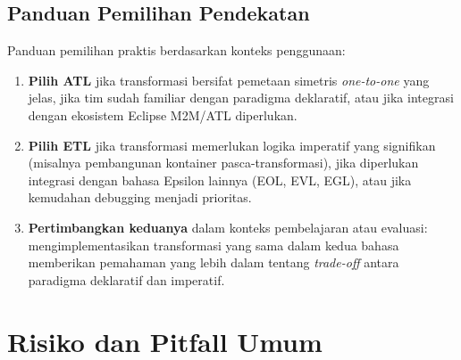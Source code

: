 \subsection{Panduan Pemilihan Pendekatan}

Panduan pemilihan praktis berdasarkan konteks penggunaan:
\begin{enumerate}
  \item \textbf{Pilih ATL} jika transformasi bersifat pemetaan simetris \textit{one-to-one} yang jelas, jika tim sudah familiar dengan paradigma deklaratif, atau jika integrasi dengan ekosistem Eclipse M2M/ATL diperlukan.
  \item \textbf{Pilih ETL} jika transformasi memerlukan logika imperatif yang signifikan (misalnya pembangunan kontainer pasca-transformasi), jika diperlukan integrasi dengan bahasa Epsilon lainnya (EOL, EVL, EGL), atau jika kemudahan debugging menjadi prioritas.
  \item \textbf{Pertimbangkan keduanya} dalam konteks pembelajaran atau evaluasi: mengimplementasikan transformasi yang sama dalam kedua bahasa memberikan pemahaman yang lebih dalam tentang \textit{trade-off} antara paradigma deklaratif dan imperatif.
\end{enumerate}

\section{Risiko dan Pitfall Umum}

